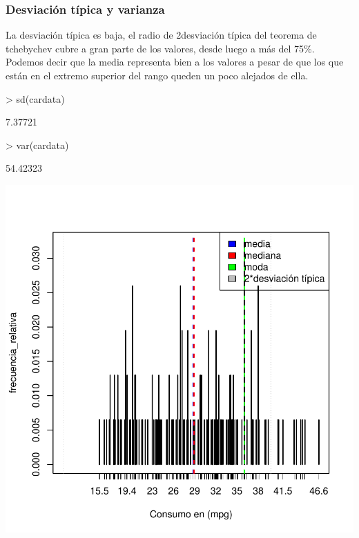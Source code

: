 \documentclass [a4paper] {article}
\begin{document}
\subsubsection{Desviación típica y varianza}
La desviación típica es baja, el radio de 2\*desviación típica del teorema de tchebychev cubre a gran parte de los valores, desde luego a más del 75\%.
Podemos decir que la media representa bien a los valores a pesar de que los que están en el extremo superior del rango queden un poco alejados de ella.
\begin{Schunk}
\begin{Sinput}
> sd(cardata)
\end{Sinput}
\begin{Soutput}
[1] 7.37721
\end{Soutput}
\begin{Sinput}
> var(cardata)
\end{Sinput}
\begin{Soutput}
[1] 54.42323
\end{Soutput}
\end{Schunk}

\begin{center}
\includegraphics{entrega-estadisticos_cardata_plot}
\end{center}

\newpage
\end{document}
